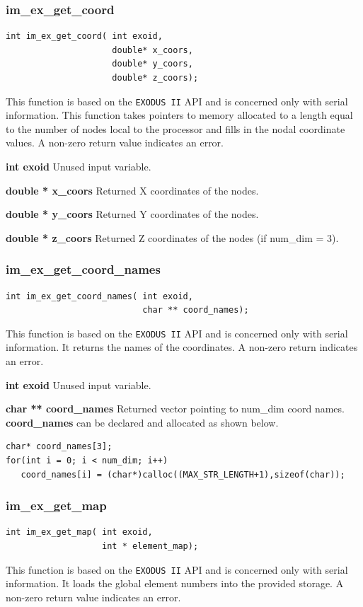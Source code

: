 \subsubsection{im\_ex\_get\_coord}
{\ttfamily  \begin{verbatim}
int im_ex_get_coord( int exoid,	
                     double* x_coors,
                     double* y_coors,
                     double* z_coors);
\end{verbatim}}
This function is based on the \texttt{EXODUS II} API and is concerned only with serial information. This function takes pointers to memory allocated to a length equal to the number of nodes local to the processor and fills in the nodal coordinate values. A non-zero return value indicates an error.

{\setlength{\parindent}{0pt}
 \textbf{int exoid} Unused input variable.}

{\setlength{\parindent}{0pt}
 \textbf{double * x\_coors} Returned X coordinates of the nodes.}

{\setlength{\parindent}{0pt}
 \textbf{double * y\_coors} Returned Y coordinates of the nodes.}

{\setlength{\parindent}{0pt}
 \textbf{double * z\_coors} Returned Z coordinates of the nodes (if num\_dim = 3).}


\subsubsection{im\_ex\_get\_coord\_names}
{\ttfamily  \begin{verbatim}
int im_ex_get_coord_names( int exoid,
                           char ** coord_names);
\end{verbatim}}
This function is based on the \texttt{EXODUS II} API and is concerned only with serial information. It returns the names of the coordinates. A non-zero return indicates an error.

{\setlength{\parindent}{0pt}
 \textbf{int exoid} Unused input variable.}

{\setlength{\parindent}{0pt}
 \textbf{char ** coord\_names} Returned vector pointing to num\_dim coord names. \textbf{coord\_names} can be declared and allocated as shown below.}
{\ttfamily  \begin{verbatim}
char* coord_names[3];
for(int i = 0; i < num_dim; i++)
   coord_names[i] = (char*)calloc((MAX_STR_LENGTH+1),sizeof(char));
\end{verbatim}}

\subsubsection{im\_ex\_get\_map}
{\ttfamily  \begin{verbatim}
int im_ex_get_map( int exoid,
                   int * element_map);
\end{verbatim}}
This function is based on the \texttt{EXODUS II} API and is concerned only with serial information. It loads the global element numbers into the provided storage. A non-zero return value indicates an error.

